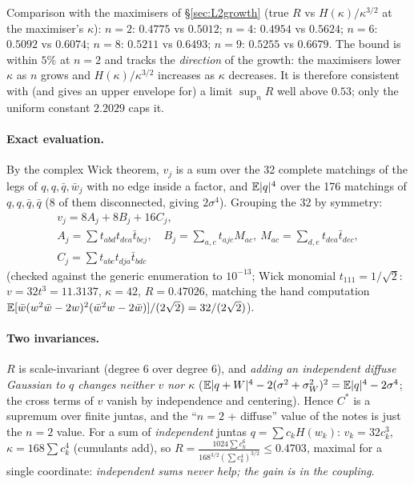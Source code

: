 Comparison with the maximisers of \S\ref{sec:L2growth} (true $R$ vs $H(\kappa)/\kappa^{3/2}$ at the maximiser's $\kappa$): $n=2$: $0.4775$ vs $0.5012$; $n=4$: $0.4954$ vs $0.5624$;
$n=6$: $0.5092$ vs $0.6074$; $n=8$: $0.5211$ vs $0.6493$; $n=9$: $0.5255$ vs $0.6679$. The bound is within $5\%$ at $n=2$ and tracks the \emph{direction} of the growth: the maximisers
lower $\kappa$ as $n$ grows and $H(\kappa)/\kappa^{3/2}$ increases as $\kappa$ decreases. It is therefore consistent with (and gives an upper envelope for) a limit $\sup_nR$ well above
$0.53$; only the uniform constant $2.2029$ caps it.


\paragraph{Exact evaluation.} By the complex Wick theorem, $v_j$ is a sum over the 32 complete matchings of the legs of $q,q,\bar q,\bar w_j$ with no edge inside a factor, and
$\mathbb E|q|^4$ over the 176 matchings of $q,q,\bar q,\bar q$ (8 of them disconnected, giving $2\sigma^4$). Grouping the 32 by symmetry:
\[\begin{gathered}
v_j=8A_j+8B_j+16C_j,\\
 A_j=\sum t_{abd}t_{dea}\bar t_{bej},\quad B_j=\sum_{a,c}t_{ajc}M_{ac},\ M_{ac}=\sum_{d,e}t_{dea}\bar t_{dec},\\
 C_j=\sum t_{abc}t_{dja}\bar t_{bdc}
\end{gathered}\]
(checked against the generic enumeration to $10^{-13}$; Wick monomial $t_{111}=1/\sqrt2$: $v=32t^3=11.3137$, $\kappa=42$, $R=0.47026$, matching the hand computation
$\mathbb E[\bar w(w^2\bar w-2w)^2(\bar w^2w-2\bar w)]/(2\sqrt2)=32/(2\sqrt2)$).

\paragraph{Two invariances.} $R$ is scale-invariant (degree 6 over degree 6), and \emph{adding an independent diffuse Gaussian to $q$ changes neither $v$ nor $\kappa$}
($\mathbb E|q+W|^4-2(\sigma^2+\sigma_W^2)^2=\mathbb E|q|^4-2\sigma^4$; the cross terms of $v$ vanish by independence and centering). Hence $C^*$ is a supremum over finite juntas, and the
``$n=2$ + diffuse'' value of the notes is just the $n=2$ value. For a sum of \emph{independent} juntas $q=\sum c_kH(w_k)$: $v_k=32c_k^3$, $\kappa=168\sum c_k^4$ (cumulants add),
so $R=\frac{1024\sum c_k^6}{168^{3/2}(\sum c_k^4)^{3/2}}\le0.4703$, maximal for a single coordinate: \emph{independent sums never help; the gain is in the coupling}.

